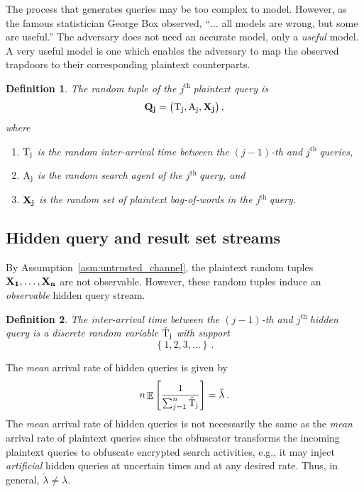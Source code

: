 \documentclass[final,11pt]{article}
\newcommand{\rvqb}[1][]{%
   \ifthenelse{ \equal{#1}{} }
      {\ensuremath{\rv{\vec{X}}}}
      {\ensuremath{\rv{\vec{X_{#1}}}}}
}
\newcommand{\rvts}[1][]{%
   \ifthenelse{ \equal{#1}{} }
      {\ensuremath{\rv{T}}}
      {\ensuremath{\rv{T_{#1}}}}
}
\newcommand{\rvhts}[1][]{%
   \ifthenelse{ \equal{#1}{} }
      {\ensuremath{\rv{\check{T}}}}
      {\ensuremath{\rv{\check{T}_{#1}}}}
}
\newcommand{\rvsa}[1][]{%
   \ifthenelse{ \equal{#1}{} }
      {\ensuremath{\rv{A}}}
      {\ensuremath{\rv{A_{#1}}}}
}
\newcommand{\rvtup}[1][]{%
   \ifthenelse{ \equal{#1}{} }
      {\ensuremath{\rv{\vec{Q}}}}
      {\ensuremath{\rv{\vec{Q_{#1}}}}}
}
\newcommand{\rv}[1]{\mathrm{#1}}
\newcommand{\jth}{$j^{\text{th }}$}
\renewcommand{\vec}[1]{\boldsymbol{\mathbf{#1}}}
\DeclareMathOperator{\expectation}{\mathbb{E}}
\numberwithin{equation}{section}
\theoremstyle{plain}
\newtheorem{definition}{Definition}[section]
\theoremstyle{remark}
\begin{document}
The process that generates queries may be too complex to model. However, as the famous statistician George Box observed, ``$\ldots$ all models are wrong, but some are useful.'' The adversary does not need an accurate model, only a \emph{useful} model. A very useful model is one which enables the adversary to map the observed trapdoors to their corresponding plaintext counterparts.

\begin{definition}
The \emph{random tuple} of the \jth plaintext query is
\begin{equation}
    \rvtup[j] = \bigl(\rvts[j], \rvsa[j], \rvqb[j]\bigr)\,,
\end{equation}
where
\begin{enumerate}
    \item [] $\rvts[j]$ is the random inter-arrival time between the $(j-1)$-th and \jth queries,
    \item [] $\rvsa[j]$ is the random search agent of the \jth query, and
    \item [] $\rvqb[j]$ is the random set of plaintext bag-of-words in the \jth query.
\end{enumerate}
\end{definition}

\subsection{Hidden query and result set streams}
By Assumption~\ref{asm:untrusted_channel}, the plaintext random tuples $\rvqb[1], \ldots, \rvqb[n]$ are not observable. However, these random tuples induce an \emph{observable} hidden query stream.

\begin{definition}
The inter-arrival time between the $(j-1)$-th and \jth hidden query is a discrete random variable $\rvhts[j]$ with support
\begin{equation}
    \left\{1,2,3,\ldots\right\}\,.
\end{equation}
\end{definition}

The \emph{mean} arrival rate of hidden queries is given by
\begin{equation}
    n \expectation\left[\frac{1}{\sum_{j=1}^{n} \rvhts[j]}\right] = \check{\lambda}\,.
\end{equation}
The \emph{mean} arrival rate of hidden queries is not necessarily the same as the \emph{mean} arrival rate of plaintext queries since the obfuscator transforms the incoming plaintext queries to obfuscate encrypted search activities, e.g., it may inject \emph{artificial} hidden queries at uncertain times and at any desired rate. Thus, in general, $\check{\lambda} \neq \lambda$.
\end{document}
